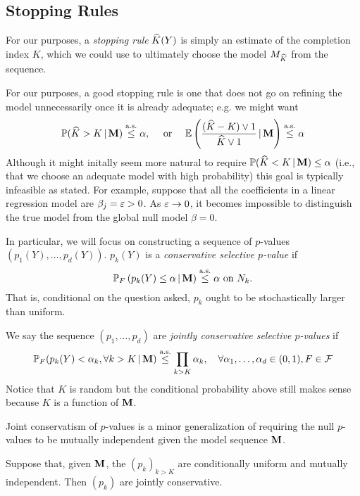 \documentclass{article}
\begin{document}
\subsection{Stopping Rules}
For our purposes, a {\em stopping rule} $\widehat{K}(Y)$ is simply an estimate of the completion index $K$, which we could use to ultimately choose the model $M_{\widehat{K}}$ from the sequence.

For our purposes, a good stopping rule is one that does not go on refining the model unnecessarily once it is already adequate; e.g. we might want
\begin{equation}
  \mathbb{P}(\widehat{K} > K \,|\, \mathbf{M}) \overset{\textrm{a.s.}}{\leq} \alpha, \quad \text{ or } \quad \mathbb{E}\left(\frac{(\widehat{K} - K)\vee 1}{\widehat{K} \vee 1} \,|\, \mathbf{M} \right) \overset{\textrm{a.s.}}{\leq} \alpha
\end{equation}
Although it might initally seem more natural to require $\mathbb{P}(\widehat{K} < K \,|\, \mathbf{M}) \leq \alpha$ (i.e., that we choose an adequate model with high probability) this goal is typically infeasible as stated. For example, suppose that all the coefficients in a linear regression model are $\beta_j=\varepsilon>0$. As $\varepsilon\rightarrow 0$, it becomes impossible to distinguish the true model from the global null model $\beta=0$.

In particular, we will focus on constructing a sequence of $p$-values $(p_1(Y),\ldots,p_d(Y))$. $p_k(Y)$ is a {\em conservative selective $p$-value} if
\begin{equation}
  \mathbb{P}_F\left(p_k(Y) \leq \alpha \,|\, \mathbf{M}\right) \overset{\textrm{a.s.}}{\leq} \alpha \text{ on } N_k.
\end{equation}
That is, conditional on the question asked, $p_k$ ought to be stochastically larger than uniform.

We say the sequence $(p_1,\ldots,p_d)$ are {\em jointly conservative selective $p$-values} if
\begin{equation}
  \mathbb{P}_F(p_k(Y) < \alpha_k, \forall k>K \,|\, \mathbf{M}) \overset{\textrm{a.s.}}{\leq} \prod_{k>K} \alpha_k, \quad \forall \alpha_1,\ldots, \alpha_d\in (0,1), F\in \mathcal{F}
\end{equation}
Notice that $K$ is random but the conditional probability above still makes sense because $K$ is a function of $\mathbf{M}$.

Joint conservatism of $p$-values is a minor generalization of requiring the null $p$-values to be mutually independent given the model sequence $\mathbf{M}$.

\begin{proposition}
  Suppose that, given $\mathbf{M}$, the $(p_k)_{k>K}$ are conditionally uniform and mutually independent. Then $(p_k)$ are jointly conservative.
\end{proposition}
\end{document}
